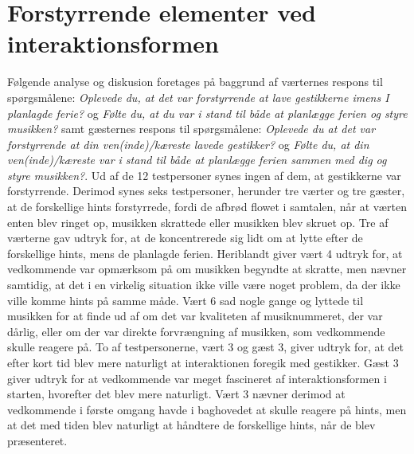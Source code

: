 \section{Forstyrrende elementer ved interaktionsformen}
\label{TestresultaterSocialAcceptForstyrrende}
%
Følgende analyse og diskusion foretages på baggrund af værternes respons til spørgsmålene: \textit{Oplevede du, at det var forstyrrende at lave gestikkerne imens I planlagde ferie?} og \textit{Følte du, at du var i stand til både at planlægge ferien og styre musikken?} samt gæsternes respons til spørgsmålene: \textit{Oplevede du at det var forstyrrende at din ven(inde)/kæreste lavede gestikker?} og \textit{Følte du, at din ven(inde)/kæreste var i stand til både at planlægge ferien sammen med dig og styre musikken?}. \blankline
%
Ud af de 12 testpersoner synes ingen af dem, at gestikkerne var forstyrrende. Derimod synes seks testpersoner, herunder tre værter og tre gæster, at de forskellige hints forstyrrede, fordi de afbrød flowet i samtalen, når at værten enten blev ringet op, musikken skrattede eller musikken blev skruet op. Tre af værterne gav udtryk for, at de koncentrerede sig lidt om at lytte efter de forskellige hints, mens de planlagde ferien. Heriblandt giver vært 4 udtryk for, at vedkommende var opmærksom på om musikken begyndte at skratte, men nævner samtidig, at det i en virkelig situation ikke ville være noget problem, da der ikke ville komme hints på samme måde. Vært 6 sad nogle gange og lyttede til musikken for at finde ud af om det var kvaliteten af musiknummeret, der var dårlig, eller om der var direkte forvrængning af musikken, som vedkommende skulle reagere på. To af testpersonerne, vært 3 og gæst 3, giver udtryk for, at det efter kort tid blev mere naturligt at interaktionen foregik med gestikker. Gæst 3 giver udtryk for at vedkommende var meget fascineret af interaktionsformen i starten, hvorefter det blev mere naturligt. Vært 3 nævner derimod at vedkommende i første omgang havde i baghovedet at skulle reagere på hints, men at det med tiden blev naturligt at håndtere de forskellige hints, når de blev præsenteret. 

